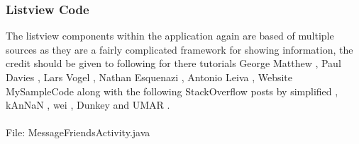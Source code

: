 \subsubsection{Listview Code}

The listview components within the application again are based of multiple sources as they are a fairly complicated framework for showing information, the credit should be given to following for there tutorials George Matthew \cite{GeorgeMatthew:AddingListItems:2012:online}, Paul Davies \cite{PaulDavies:AndroidListView:2014:online}, Lars Vogel \cite{LarsVogel:UsingLists:2014:online}, Nathan Esquenazi \cite{NathanEsquenazi:UsingArrayAdapter:2013:online}, Antonio Leiva \cite{AntonioLeiva:SwipeToRefreshLayout:2014:online}, Website MySampleCode \cite{MySampleCode:CheckboxExample:2012:online} along with the following StackOverflow posts by simplified \cite{simplified:AndroidListViewinFragment:2011:online}, kAnNaN \cite{kAnNaN:PopulatingaListViewusingArrayList:2011:online}, wei \cite{wei:AndroidIsitpossibletorefreshjustoneiteminalistview:2010:online}, Dunkey \cite{Dunkey:Androidsortlistviewalphabetically:2013:online} and UMAR \cite{UMAR:HowtorefreshAndroidlistview:2010:online}.\\
\\
File: MessageFriendsActivity.java

